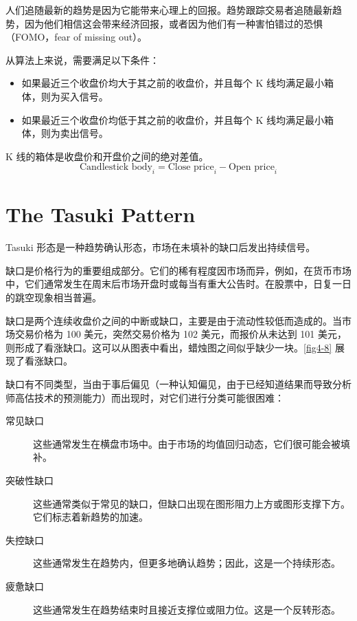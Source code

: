 \begin{tcolorbox}
    人们追随最新的趋势是因为它能带来心理上的回报。趋势跟踪交易者追随最新趋势，因为他们相信这会带来经济回报，或者因为他们有一种害怕错过的恐惧（FOMO，fear of missing out）。
\end{tcolorbox}

从算法上来说，需要满足以下条件：
\begin{itemize}
    \item 如果最近三个收盘价均大于其之前的收盘价，并且每个 K 线均满足最小箱体，则为买入信号。

    \item 如果最近三个收盘价均低于其之前的收盘价，并且每个 K 线均满足最小箱体，则为卖出信号。
\end{itemize}

K 线的箱体是收盘价和开盘价之间的绝对差值。
\begin{equation}
    \text{Candlestick body}_i = \text{Close price}_i - \text{Open price}_i
\end{equation}
\section{The Tasuki Pattern}
Tasuki 形态是一种趋势确认形态，市场在未填补的缺口后发出持续信号。

缺口是价格行为的重要组成部分。它们的稀有程度因市场而异，例如，在货币市场中，它们通常发生在周末后市场开盘时或每当有重大公告时。在股票中，日复一日的跳空现象相当普遍。

缺口是两个连续收盘价之间的中断或缺口，主要是由于流动性较低而造成的。当市场交易价格为 100 美元，突然交易价格为 102 美元，而报价从未达到 101 美元，则形成了看涨缺口。这可以从图表中看出，蜡烛图之间似乎缺少一块。\autoref{fig4-8} 展现了看涨缺口。


缺口有不同类型，当由于事后偏见（一种认知偏见，由于已经知道结果而导致分析师高估技术的预测能力）而出现时，对它们进行分类可能很困难：

\begin{description}
    \item[常见缺口]这些通常发生在横盘市场中。由于市场的均值回归动态，它们很可能会被填补。
    \item[突破性缺口]这些通常类似于常见的缺口，但缺口出现在图形阻力上方或图形支撑下方。它们标志着新趋势的加速。
    \item[失控缺口]这些通常发生在趋势内，但更多地确认趋势；因此，这是一个持续形态。
    \item[疲惫缺口]这些通常发生在趋势结束时且接近支撑位或阻力位。这是一个反转形态。
\end{description}

